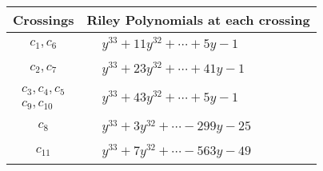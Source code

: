 \documentclass[1p]{elsarticle_modified}
\theoremstyle{definition}
\begin{document}
\begin{tabular}{m{50pt}|m{274pt}}
Crossings & \hspace{64pt}Riley Polynomials at each crossing \\
\hline $$\begin{aligned}c_{1},c_{6}\end{aligned}$$&$\begin{aligned}
&y^{33}+11 y^{32}+\cdots+5 y-1
\end{aligned}$\\
\hline $$\begin{aligned}c_{2},c_{7}\end{aligned}$$&$\begin{aligned}
&y^{33}+23 y^{32}+\cdots+41 y-1
\end{aligned}$\\
\hline $$\begin{aligned}c_{3},c_{4},c_{5}\\c_{9},c_{10}\end{aligned}$$&$\begin{aligned}
&y^{33}+43 y^{32}+\cdots+5 y-1
\end{aligned}$\\
\hline $$\begin{aligned}c_{8}\end{aligned}$$&$\begin{aligned}
&y^{33}+3 y^{32}+\cdots-299 y-25
\end{aligned}$\\
\hline $$\begin{aligned}c_{11}\end{aligned}$$&$\begin{aligned}
&y^{33}+7 y^{32}+\cdots-563 y-49
\end{aligned}$\\
\hline
\end{tabular}
\vskip 2pc
\end{document}
